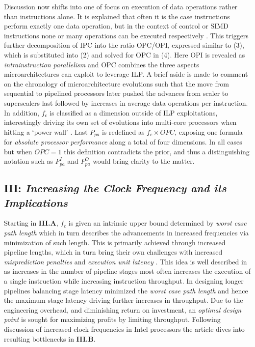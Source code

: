\documentclass{article}
\begin{document}
Discussion now shifts into one of focus on execution of data operations rather than instructions alone.
It is explained that often it is the case instructions perform exactly one data operation, but in the context of control or SIMD instructions none or many operations can be executed respectively \cite{Sima}.
This triggers further decomposition of IPC into the ratio OPC/OPI, expressed similar to (3), which is substituted into (2) and solved for OPC in (4).
Here OPI is revealed as \emph{intrainstruction parallelism} and OPC combines the three aspects microarchitectures can exploit to leverage ILP.
A brief aside is made to comment on the chronology of microarchitecture evolutions such that the move from sequential to pipelined processors later pushed the advances from scaler to superscalers last followed by increases in average data operations per instruction.
In addition, $f_{c}$ is classified as a dimension outside of ILP exploitations, interestingly driving its own set of evolutions into multi-core processors when hitting a `power wall' \cite{Bryant}.
Last $P_{pa}$ is redefined as $f_{c} \times OPC$, exposing one formula for \emph{absolute processor performance} along a total of four dimensions.
In all cases but when $OPC = 1$ this definition contradicts the prior, and thus a distinguishing notation such as $P_{pa}^{I}$ and $P_{pa}^{O}$ would bring clarity to the matter.

\subsection{\textbf{III}: \emph{Increasing the Clock Frequency and its Implications}}
Starting in \textbf{III.A}, $f_{c}$ is given an intrinsic upper bound determined by \emph{worst case path length} which in turn describes the advancements in increased frequencies via minimization of such length.
This is primarily achieved through increased pipeline lengths, which in turn bring their own challenges with increased \emph{misprediction penalties} and \emph{execution unit latency} \cite{Sima}.
This idea is well described in \cite{Hennessy} as increases in the number of pipeline stages most often increases the execution of a single instruction while increasing instruction throughput. In designing longer pipelines balancing stage latency minimized the \emph{worst case path length} and hence the maximum stage latency driving further increases in throughput.
Due to the engineering overhead, and diminishing return on investment, an \emph{optimal design point} is sought for maximizing profits by limiting throughput.
Following discussion of increased clock frequencies in Intel processors the article dives into resulting bottlenecks in \textbf{III.B}.
\end{document}
